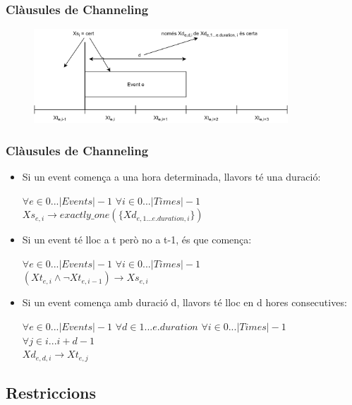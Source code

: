 \documentclass[13pt]{beamer}
\begin{document}
  \begin{frame}
    \frametitle{Clàusules de Channeling} 
    \begin{figure}[p]
      \includegraphics[width=0.85\textwidth]{Diagrames/DiagramaChanneling.png}
      \label{fig:procs}
    \end{figure} 

  
    \end{frame}
  

  \begin{frame}
  \frametitle{Clàusules de Channeling}  

  \begin{itemize}
    \item Si un event comença a una hora determinada, llavors té una duració: 
  \begin{center} 
  $\forall e \in 0 ... |Events|-1$ $\forall i \in 0 ... |Times|-1$ \\
  $Xs_{e,i} \rightarrow exactly\_one(\{Xd_{e,1 ... e.duration,i}\})$\end{center}
    \item Si un event té lloc a t però no a t-1, és que comença: 
  \begin{center} 
  $\forall e \in 0 ... |Events|-1$ $\forall i \in 0 ... |Times|-1$ \\$(Xt_{e,i} \land \neg Xt_{e,i-1}) \rightarrow Xs_{e,i}$ \end{center}
    \item Si un event comença amb duració d, llavors té lloc en d hores consecutives: 
    \begin{center} 
      $\forall e \in 0 ... |Events|-1$ $\forall d \in 1 ... e.duration$ $\forall i \in 0 ... |Times|-1$ $\forall j \in i ... i+d-1$ \\
      $Xd_{e,d,i} \rightarrow Xt_{e,j}$    
    \end{center}
  \end{itemize}

  \end{frame}

  \subsection{Restriccions}
\end{document}
